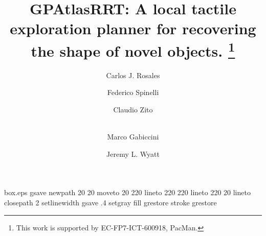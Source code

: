 \RequirePackage{fix-cm}

\begin{filecontents*}{box.eps}
gsave
newpath
  20 20 moveto
  20 220 lineto
  220 220 lineto
  220 20 lineto
closepath
2 setlinewidth
gsave
  .4 setgray fill
grestore
stroke
grestore
\end{filecontents*}

\documentclass[twocolumn,natbib,final]{svjour3}
\smartqed  %

\usepackage{graphicx}
\graphicspath{ {./img/} {../img/} }
\usepackage{multirow}
\usepackage{colortbl}
\usepackage{booktabs}
\usepackage[algoruled,vlined]{algorithm2e}
\usepackage{amsmath,amsfonts,amssymb,amsxtra,amsbsy,amsopn}
\usepackage{paralist}
\usepackage{booktabs}
\usepackage{tabularx}
\DeclareMathOperator*{\argmax}{arg\,max}

\usepackage[textsize=tiny]{todonotes}




\title{%
        GPAtlasRRT: A local tactile exploration planner for recovering the shape of novel objects.
  \thanks{This work is supported by EC-FP7-ICT-600918, PacMan.}
}

\author{Carlos J. Rosales         \and
        Federico Spinelli         \and 
        Claudio Zito              \and\\
        Marco Gabiccini           \and
        Jeremy L. Wyatt
}


